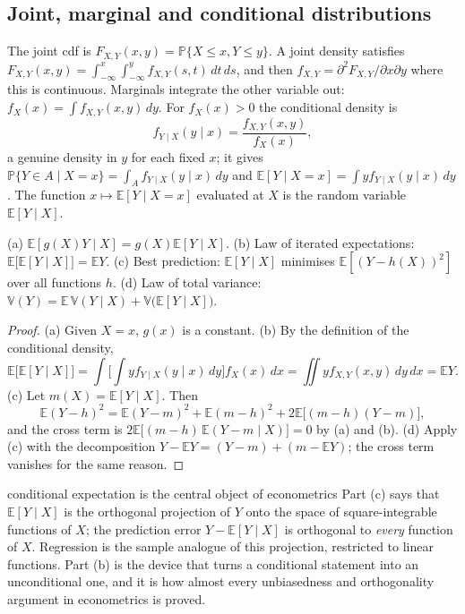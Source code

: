 \documentclass[11pt,a4paper]{article}
\newcommand{\E}{\mathbb{E}}
\newcommand{\V}{\mathbb{V}}
\renewcommand{\P}{\mathbb{P}}
\begin{document}
\subsection{Joint, marginal and conditional distributions}

The joint cdf is $F_{X,Y}(x,y)=\P\{X\le x,Y\le y\}$. A joint density satisfies $F_{X,Y}(x,y)=\int_{-\infty}^x\int_{-\infty}^yf_{X,Y}(s,t)\,dt\,ds$, and then $f_{X,Y}=\partial^2F_{X,Y}/\partial x\partial y$ where this is continuous. Marginals integrate the other variable out: $f_X(x)=\int f_{X,Y}(x,y)\,dy$. For $f_X(x)>0$ the conditional density is
\[
f_{Y\mid X}(y\mid x)=\frac{f_{X,Y}(x,y)}{f_X(x)},
\]
a genuine density in $y$ for each fixed $x$; it gives $\P\{Y\in A\mid X=x\}=\int_Af_{Y\mid X}(y\mid x)\,dy$ and $\E[Y\mid X=x]=\int yf_{Y\mid X}(y\mid x)\,dy$. The function $x\mapsto\E[Y\mid X=x]$ evaluated at $X$ is the random variable $\E[Y\mid X]$.

\begin{theorem}\label{thm:lie}
\textup{(a)} $\E[g(X)Y\mid X]=g(X)\E[Y\mid X]$. \textup{(b)} Law of iterated expectations: $\E\big[\E[Y\mid X]\big]=\E Y$. \textup{(c)} Best prediction: $\E[Y\mid X]$ minimises $\E[(Y-h(X))^2]$ over all functions $h$. \textup{(d)} Law of total variance: $\V(Y)=\E\,\V(Y\mid X)+\V\big(\E[Y\mid X]\big)$.
\end{theorem}

\begin{proof}
(a) Given $X=x$, $g(x)$ is a constant. (b) By the definition of the conditional density,
\[
\E\big[\E[Y\mid X]\big]=\int\Big[\int yf_{Y\mid X}(y\mid x)\,dy\Big]f_X(x)\,dx=\iint yf_{X,Y}(x,y)\,dy\,dx=\E Y.
\]
(c) Let $m(X)=\E[Y\mid X]$. Then
\[
\E(Y-h)^2=\E(Y-m)^2+\E(m-h)^2+2\E\big[(m-h)(Y-m)\big],
\]
and the cross term is $2\E\big[(m-h)\,\E(Y-m\mid X)\big]=0$ by (a) and (b). (d) Apply (c) with the decomposition $Y-\E Y=(Y-m)+(m-\E Y)$; the cross term vanishes for the same reason.
\end{proof}

\begin{whybox}{conditional expectation is the central object of econometrics}
Part (c) says that $\E[Y\mid X]$ is the orthogonal projection of $Y$ onto the space of square-integrable functions of $X$; the prediction error $Y-\E[Y\mid X]$ is orthogonal to \emph{every} function of $X$. Regression is the sample analogue of this projection, restricted to linear functions. Part (b) is the device that turns a conditional statement into an unconditional one, and it is how almost every unbiasedness and orthogonality argument in econometrics is proved.
\end{whybox}
\end{document}
